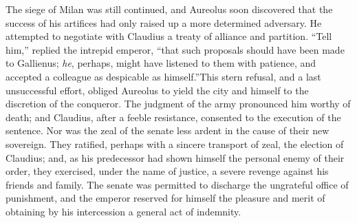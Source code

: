 



The siege of Milan was still continued, and Aureolus soon
discovered that the success of his artifices had only raised up a
more determined adversary. He attempted to negotiate with
Claudius a treaty of alliance and partition. “Tell him,” replied
the intrepid emperor, “that such proposals should have been made
to Gallienus; \textit{he}, perhaps, might have listened to them with
patience, and accepted a colleague as despicable as himself.”\footnotemark[7]
This stern refusal, and a last unsuccessful effort, obliged
Aureolus to yield the city and himself to the discretion of the
conqueror. The judgment of the army pronounced him worthy of
death; and Claudius, after a feeble resistance, consented to the
execution of the sentence. Nor was the zeal of the senate less
ardent in the cause of their new sovereign. They ratified,
perhaps with a sincere transport of zeal, the election of
Claudius; and, as his predecessor had shown himself the personal
enemy of their order, they exercised, under the name of justice,
a severe revenge against his friends and family. The senate was
permitted to discharge the ungrateful office of punishment, and
the emperor reserved for himself the pleasure and merit of
obtaining by his intercession a general act of indemnity.\footnotemark[8]



